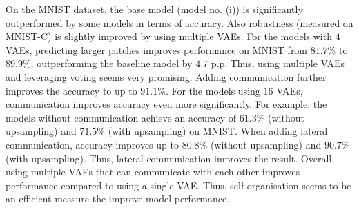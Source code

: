 On the MNIST dataset, the base model (model no. (i)) is significantly outperformed by some models in terms of accuracy. Also robustness (measured on MNIST-C) is slightly improved by using multiple VAEs. For the models with $4$ VAEs, predicting larger patches improves performance on MNIST from $81.7\%$ to $89.9\%$, outperforming the baseline model by $4.7$ p.p. Thus, using multiple VAEs and leveraging voting seems very promising. Adding communication further improves the accuracy to up to $91.1\%$.
For the models using $16$ VAEs, communication improves accuracy even more significantly. For example, the models without communication achieve an accuracy of $61.3\%$ (without upsampling)  and $71.5\%$ (with upsampling) on MNIST.  When adding lateral communication, accuracy improves up to $80.8\%$ (without upsampling) and $90.7\%$ (with upsampling). Thus, lateral communication improves the result.
Overall, using multiple VAEs that can communicate with each other improves performance compared to using a single VAE. Thus, self-organisation seems to be an efficient measure the improve model performance.







